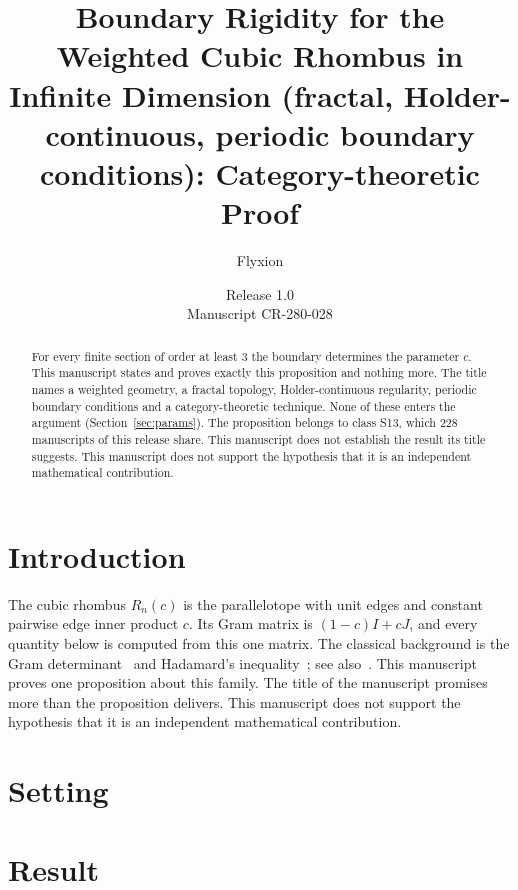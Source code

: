 \documentclass[11pt]{article}
\title{Boundary Rigidity for the Weighted Cubic Rhombus in Infinite Dimension (fractal, Holder-continuous, periodic boundary conditions): Category-theoretic Proof}
\author{Flyxion}
\date{Release 1.0\\ Manuscript CR-280-028}
\begin{document}
\maketitle
\begin{abstract}
For every finite section of order at least $3$ the boundary determines the parameter $c$. This manuscript states and proves exactly this proposition and nothing more. The title names a weighted geometry, a fractal topology, Holder-continuous regularity, periodic boundary conditions and a category-theoretic technique. None of these enters the argument (Section~\ref{sec:params}). The proposition belongs to class S13, which 228 manuscripts of this release share. This manuscript does not establish the result its title suggests. This manuscript does not support the hypothesis that it is an independent mathematical contribution.
\end{abstract}

\section{Introduction}
The cubic rhombus $R_n(c)$ is the parallelotope with unit edges and constant pairwise edge inner product $c$. Its Gram matrix is $(1-c)I+cJ$, and every quantity below is computed from this one matrix. The classical background is the Gram determinant~\cite{gram} and Hadamard's inequality~\cite{hadamard}; see also~\cite{hj}.
This manuscript proves one proposition about this family. The title of the manuscript promises more than the proposition delivers. This manuscript does not support the hypothesis that it is an independent mathematical contribution.

\section{Setting}


\section{Result}

\end{document}
